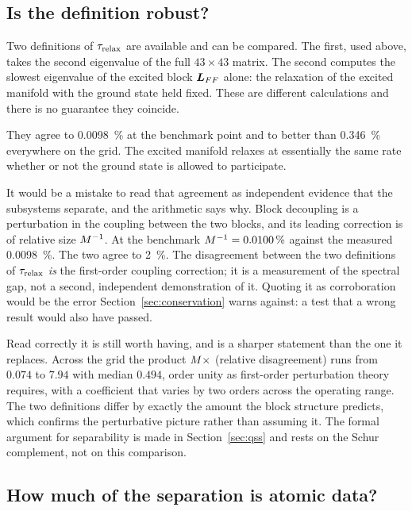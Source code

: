 \subsection{Is the definition robust?}

Two definitions of $\tau_{\mathrm{relax}}$ are available and can be compared.
The first, used above, takes the second eigenvalue of the full $43\times43$
matrix. The second computes the slowest eigenvalue of the excited block
$\bm{L}_{FF}$ alone: the relaxation of the excited manifold with the
ground state held fixed. These are different calculations and there is no
guarantee they coincide.

They agree to \SI{0.0098}{\percent} at the benchmark point and to better than
\SI{0.346}{\percent} everywhere on the grid. The excited manifold relaxes at
essentially the same rate whether or not the ground state is allowed to
participate.

It would be a mistake to read that agreement as independent evidence that the
subsystems separate, and the arithmetic says why. Block decoupling is a
perturbation in the coupling between the two blocks, and its leading correction
is of relative size $M^{-1}$. At the benchmark $M^{-1} =
\SI{0.0100}{\percent}$ against the measured \SI{0.0098}{\percent}. The two
agree to \SI{2}{\percent}. The disagreement between the two definitions of
$\tau_{\mathrm{relax}}$ \emph{is} the first-order coupling correction; it is a measurement of
the spectral gap, not a second, independent demonstration of it. Quoting it as
corroboration would be the error Section~\ref{sec:conservation} warns against:
a test that a wrong result would also have passed.

Read correctly it is still worth having, and is a sharper statement than the
one it replaces. Across the grid the product $M \times$ (relative
disagreement) runs from $0.074$ to $7.94$ with median $0.494$, order unity as
first-order perturbation theory requires, with a coefficient that varies by
two orders across the operating range. The two definitions differ by exactly
the amount the block structure predicts, which confirms the perturbative
picture rather than assuming it. The formal argument for separability is made
in Section~\ref{sec:qss} and rests on the Schur complement, not on this
comparison.

\subsection{How much of the separation is atomic data?}
\label{sec:M_atomic_systematic}

